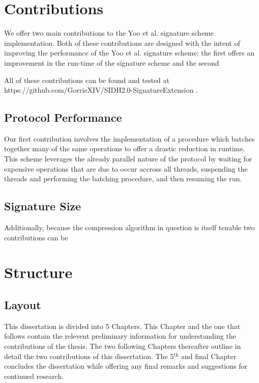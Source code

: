 \section{Contributions}

We offer two main contributions to the Yoo et al. signature scheme implementation. Both of these contributions are designed with the intent of improving the performance of the Yoo et al. signature scheme: the first offers an improvement in the run-time of the signature scheme and the second 

All of these contributions can be found and tested at https://github.com/GorrieXIV/SIDH2.0-SignatureExtension .

\subsection{Protocol Performance}

Our first contribution involves the implementation of a procedure which batches together many of the same operations to offer a drastic reduction in runtime. This scheme leverages the already parallel nature of the protocol by waiting for expensive operations that are due to occur accross all threads, suspending the threads and performing the batching procedure, and then resuming the run.


\subsection{Signature Size}


Additionally, because the compression algorithm in question is itself tenable two contributions can be \\

\section{Structure}


\subsection{Layout}

This dissertation is divided into 5 Chapters. This Chapter and the one that follows contain the relevent preliminary information for understanding the contributions of the thesis. The two following Chapters thereafter outline in detail the two contributions of this dissertation. The 5$^{\text{th}}$ and final Chapter concludes the dissertation while offering any final remarks and suggestions for continued research.

